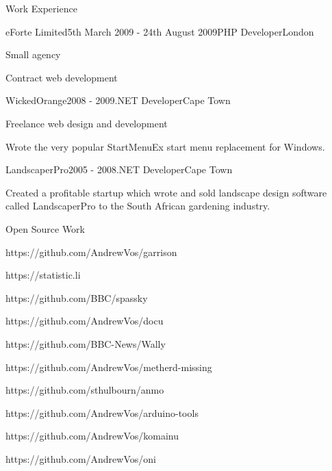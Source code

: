 \documentclass{resume}
\begin{document}
\begin{rSection}{Work Experience}
    \begin{rSubsection}{eForte Limited}{5th March 2009 - 24th August 2009}{PHP Developer}{London}
      \item Small agency
      \item Contract web development
    \end{rSubsection}

    \begin{rSubsection}{WickedOrange}{2008 - 2009}{.NET Developer}{Cape Town}
      \item Freelance web design and development
      \item Wrote the very popular StartMenuEx start menu replacement for Windows.
    \end{rSubsection}

    \begin{rSubsection}{LandscaperPro}{2005 - 2008}{.NET Developer}{Cape Town}
      \item Created a profitable startup which wrote and sold landscape design software called LandscaperPro to the South African gardening industry.
    \end{rSubsection}
  \end{rSection}

  \begin{rSection}{Open Source Work}
    \item https://github.com/AndrewVos/garrison
    \item https://statistic.li
    \item https://github.com/BBC/spassky
    \item https://github.com/AndrewVos/docu
    \item https://github.com/BBC-News/Wally
    \item https://github.com/AndrewVos/metherd-missing
    \item https://github.com/sthulbourn/anmo
    \item https://github.com/AndrewVos/arduino-tools
    \item https://github.com/AndrewVos/komainu
    \item https://github.com/AndrewVos/oni
  \end{rSection}
\end{document}
